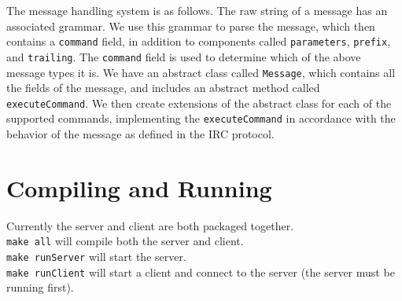 \documentclass{article}
\begin{document}
The message handling system is as follows.  The raw string of a message has an associated
grammar.  We use this grammar to parse the message, which then contains a \texttt{command}
field, in addition to components called \texttt{parameters}, \texttt{prefix}, and \texttt{trailing}.
The \texttt{command} field is used to determine which of the above message types it is.
We have an abstract class called \texttt{Message}, which contains all the fields of the message,
and includes an abstract method called \texttt{executeCommand}.  We then create extensions of the
abstract class for each of the supported commands, implementing the \texttt{executeCommand} in
accordance with the behavior of the message as defined in the IRC protocol.

\section{Compiling and Running}

Currently the server and client are both packaged together.\\

\texttt{make all} will compile both the server and client.\\

\texttt{make runServer} will start the server.\\

\texttt{make runClient} will start a client and connect to the server (the server must be running first).\\
\end{document}
